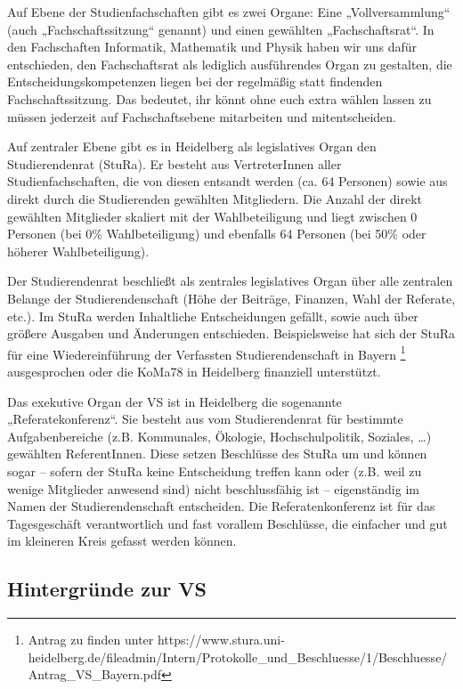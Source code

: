 Auf Ebene der Studienfachschaften gibt es zwei Organe: Eine „Vollversammlung“
(auch „Fachschaftssitzung“ genannt) und einen gewählten „Fachschaftsrat“. In
den Fachschaften Informatik, Mathematik und Physik haben wir uns dafür
entschieden, den Fachschaftsrat als lediglich ausführendes Organ zu gestalten,
die Entscheidungskompetenzen liegen bei der regelmäßig statt findenden
Fachschaftssitzung.  Das bedeutet, ihr könnt ohne euch extra wählen lassen zu
müssen jederzeit auf Fachschaftsebene mitarbeiten und mitentscheiden.

Auf zentraler Ebene gibt es in Heidelberg als legislatives Organ den
Studierendenrat (StuRa).  Er besteht aus VertreterInnen aller
Studienfachschaften, die von diesen entsandt werden (ca. 64 Personen) sowie aus
direkt durch die Studierenden gewählten Mitgliedern.  Die Anzahl der direkt
gewählten Mitglieder skaliert mit der Wahlbeteiligung und liegt zwischen 0
Personen (bei 0\% Wahlbeteiligung) und ebenfalls 64 Personen (bei 50\% oder
höherer Wahlbeteiligung).

Der Studierendenrat beschließt als zentrales legislatives Organ über alle
zentralen Belange der Studierendenschaft (Höhe der Beiträge, Finanzen, Wahl der
Referate, etc.). Im StuRa werden Inhaltliche Entscheidungen gefällt, sowie auch
über größere Ausgaben und Änderungen entschieden. Beispielsweise hat sich der
StuRa für eine Wiedereinführung der Verfassten Studierendenschaft in Bayern
\footnote{Antrag zu finden unter
https://www.stura.uni-heidelberg.de/fileadmin/Intern/Protokolle_und_Beschluesse/1/Beschluesse/Antrag_VS_Bayern.pdf}
ausgesprochen oder die KoMa78 in Heidelberg finanziell unterstützt.


Das exekutive Organ der VS ist in Heidelberg die sogenannte
„Referatekonferenz“.  Sie besteht aus vom Studierendenrat für bestimmte
Aufgabenbereiche (z.B.  Kommunales, Ökologie, Hochschulpolitik, Soziales,
\dots) gewählten ReferentInnen. Diese setzen Beschlüsse des StuRa um und können
sogar -- sofern der StuRa keine Entscheidung treffen kann oder (z.B. weil zu
wenige Mitglieder anwesend sind) nicht beschlussfähig ist -- eigenständig im
Namen der Studierendenschaft entscheiden. Die Referatenkonferenz ist für das
Tagesgeschäft verantwortlich und fast vorallem Beschlüsse, die einfacher und
gut im kleineren Kreis gefasst werden können. 

\subsection{Hintergründe zur VS}

